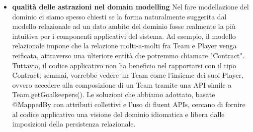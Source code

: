 \begin{itemize}
    \item \textbf{qualità delle astrazioni nel domain modelling} \newline
        Nel fare modellazione del dominio ci siamo spesso chiesti se la forma naturalmente suggerita 
        dal modello relazionale ad un dato ambito del dominio fosse realmente la più intuitiva 
        per i componenti applicativi del sistema. Ad esempio, il modello relazionale impone che 
        la relazione molti-a-molti fra Team e Player venga reificata, attraverso una ulteriore 
        entità che potremmo chiamare "Contract". Tuttavia, il codice applicativo non ha beneficio 
        nel rapportarsi con il tipo Contract; semmai, vorrebbe vedere un Team come l'insieme dei 
        suoi Player, ovvero accedere alla composizione di un Team tramite una API simile a 
        Team.getGoalkeepers().
        Le soluzioni che abbiamo adottato, basate @MappedBy con attributi collettivi e l'uso 
        di fluent APIs, cercano di fornire al codice applicativo una visione del dominio 
        idiomatica e libera dalle imposizioni della persistenza relazionale.


\end{itemize}
